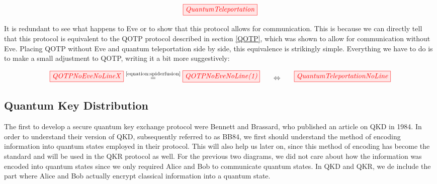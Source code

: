 \documentclass[]{article}
\newcommand{\equaltext}[1]{\ensuremath{\stackrel{\text{#1}}{=}}}
\begin{document}
\begin{equation}
	\label{equation:quantumteleportation}
	\tikzfig{QuantumTeleportation}
\end{equation}
 
It is redundant to see what happens to Eve or to show that this protocol allows for communication. This is because we can directly tell that this protocol is equivalent to the QOTP protocol described in section \ref{QOTP}, which was shown to allow for communication without Eve. Placing QOTP without Eve and quantum teleportation side by side, this equivalence is strikingly simple. Everything we have to do is to make a small adjustment to QOTP, writing it a bit more suggestively:

\begin{equation}
\label{equation:QOTPQuantumTeleportationEquivalence}
\tikzfig{QOTPNoEveNoLineX} \equaltext{\ref{equation:spiderfusion}} \tikzfig{QOTPNoEveNoLine(1)}~~~~~ \Leftrightarrow ~~~~~\tikzfig{QuantumTeleportationNoLine}
\end{equation}
 
\subsection{Quantum Key Distribution}

\label{QuantumKeyDistribution}

The first to develop a secure quantum key exchange protocol were Bennett and Brassard, who published an article on QKD in 1984. In order to understand their version of QKD, subsequently referred to as BB84, we first should understand the method of encoding information into quantum states employed in their protocol. This will also help us later on, since this method of encoding has become the standard and will be used in the QKR protocol as well. For the previous two diagrams, we did not care about how the information was encoded into quantum states since we only required Alice and Bob to communicate quantum states. In QKD and QKR, we de include the part where Alice and Bob actually encrypt classical information into a quantum state.
\end{document}
